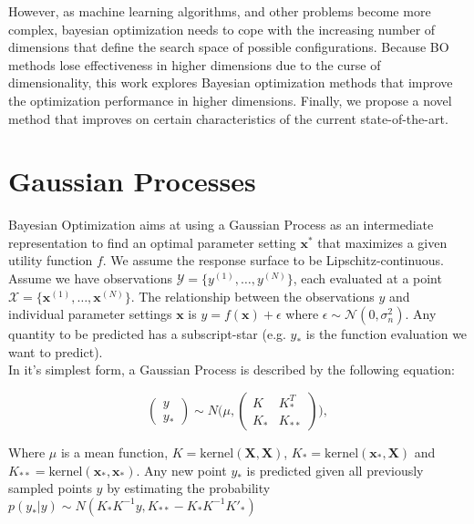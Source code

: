However, as machine learning algorithms, and other problems become more complex, bayesian optimization needs to cope with the increasing number of dimensions that define the search space of possible configurations.
Because BO methods lose effectiveness in higher dimensions due to the curse of dimensionality, this work  explores Bayesian optimization methods that improve the optimization performance in higher dimensions.
Finally, we propose a novel method that improves on certain characteristics of the current state-of-the-art.

\section{Gaussian Processes}
Bayesian Optimization aims at using a Gaussian Process as an intermediate representation to find an optimal parameter setting $\mathbf{x^*}$ that maximizes a given utility function $f$.
We assume the response surface to be Lipschitz-continuous. \\

Assume we have observations $ \mathcal{Y} = \{ y^{(1)}, \ldots, y^{(N)} \}$, each evaluated at a point $ \mathcal{X} = \{  \mathbf{x}^{(1)}, \ldots, \mathbf{x}^{(N)} \}$.
The relationship between the observations $y$ and individual parameter settings $\mathbf{x}$ is $y = f \left( \mathbf{x} \right) + \epsilon$ where $\epsilon \sim  \mathcal{N} \left( 0, \sigma^2_n \right)$. Any quantity to be predicted has a subscript-star (e.g. $y_*$ is the function evaluation we want to predict).\\

In it's simplest form, a Gaussian Process is described by the following equation:

\begin{equation}
\begin{pmatrix} y \\
y_* \end{pmatrix} \sim N\Biggl(\mu,\begin{pmatrix} K & K^T_*\\
 K_* & K_{**} \end{pmatrix}\Biggr),
\end{equation}

Where $\mu$ is a mean function, $K = \text{kernel}(\mathbf{X}, \mathbf{X})$, $K_* = \text{kernel}(\mathbf{x_*}, \mathbf{X})$ and $K_{**} = \text{kernel}(\mathbf{x_*}, \mathbf{x_*})$.
Any new point $y_*$ is predicted given all previously sampled points $y$ by estimating the probability $ p(y_*|y) \sim N(K_*K^{-1}y,K_{**}-K_*K^{-1}K'_*) $\\

